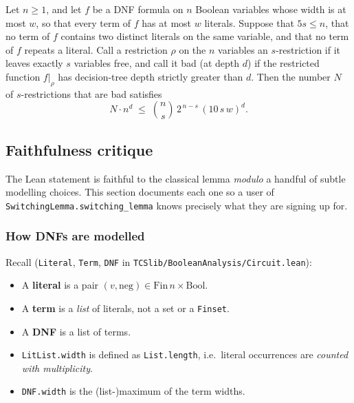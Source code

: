 \begin{theorem}
Let $n \ge 1$, and let $f$ be a DNF formula on $n$ Boolean variables whose width is at
most $w$, so that every term of $f$ has at most $w$ literals. Suppose that $5s \le n$,
that no term of $f$ contains two distinct literals on the same variable, and that no
term of $f$ repeats a literal. Call a restriction $\rho$ on the $n$ variables an
$s$-restriction if it leaves exactly $s$ variables free, and call it bad (at depth $d$)
if the restricted function $f|_\rho$ has decision-tree depth strictly greater than $d$.
Then the number $N$ of $s$-restrictions that are bad satisfies
\[
  N \cdot n^{d} \;\le\; \binom{n}{s}\, 2^{\,n-s}\, (10\,s\,w)^{d}.
\]
\end{theorem}

\subsection{Faithfulness critique}\label{sec:faithfulness}

The Lean statement is faithful to the classical lemma \emph{modulo} a handful
of subtle modelling choices.  This section documents each one so a user of
\texttt{SwitchingLemma.switching\_lemma} knows precisely what they are signing
up for.

\subsubsection{How DNFs are modelled}

Recall (\texttt{Literal}, \texttt{Term}, \texttt{DNF} in
\texttt{TCSlib/BooleanAnalysis/Circuit.lean}):
\begin{itemize}
  \item A \textbf{literal} is a pair $(v,\mathrm{neg})\in\mathrm{Fin}\,n\times\mathrm{Bool}$.
  \item A \textbf{term} is a \emph{list} of literals, not a set or a
        \texttt{Finset}.
  \item A \textbf{DNF} is a list of terms.
  \item \texttt{LitList.width} is defined as \texttt{List.length}, i.e.\ literal
        occurrences are \emph{counted with multiplicity}.
  \item \texttt{DNF.width} is the (list-)maximum of the term widths.
\end{itemize}

